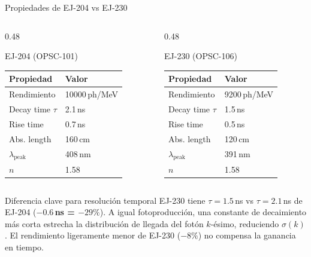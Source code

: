 \documentclass[aspectratio=169,10pt]{beamer}
\begin{document}
\begin{frame}{Propiedades de EJ-204 vs EJ-230}

\begin{columns}[T]
  \begin{column}{0.48\textwidth}
  \begin{block}{\color{ej204col}EJ-204 (OPSC-101)}
    \footnotesize
    \begin{tabular}{@{}ll@{}}
      \toprule
      Propiedad & Valor \\
      \midrule
      Rendimiento & \num{10000}\,ph/MeV \\
      Decay time $\tau$ & 2.1\,ns \\
      Rise time & 0.7\,ns \\
      Abs. length & 160\,cm \\
      $\lambda_\text{peak}$ & 408\,nm \\
      $n$ & 1.58 \\
      \bottomrule
    \end{tabular}
  \end{block}
  \end{column}

  \begin{column}{0.48\textwidth}
  \begin{block}{\color{ej230col}EJ-230 (OPSC-106)}
    \footnotesize
    \begin{tabular}{@{}ll@{}}
      \toprule
      Propiedad & Valor \\
      \midrule
      Rendimiento & \num{9200}\,ph/MeV \\
      Decay time $\tau$ & 1.5\,ns \\
      Rise time & 0.5\,ns \\
      Abs. length & 120\,cm \\
      $\lambda_\text{peak}$ & 391\,nm \\
      $n$ & 1.58 \\
      \bottomrule
    \end{tabular}
  \end{block}
  \end{column}
\end{columns}

\vspace{0.5em}
\begin{alertblock}{Diferencia clave para resolución temporal}
\footnotesize
EJ-230 tiene $\tau = 1.5$\,ns vs $\tau = 2.1$\,ns de EJ-204
(\textbf{$-0.6$\,ns = $-29\%$}).
A igual fotoproducción, una constante de decaimiento más corta
estrecha la distribución de llegada del fotón $k$-ésimo,
reduciendo $\sigma(k)$. El rendimiento ligeramente menor de EJ-230
($-8\%$) no compensa la ganancia en tiempo.
\end{alertblock}

\end{frame}
\end{document}
